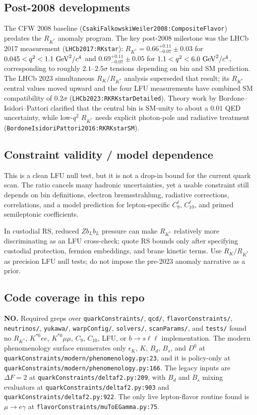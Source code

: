 \subsection*{Post-2008 developments}
The CFW 2008 baseline (\texttt{CsakiFalkowskiWeiler2008:CompositeFlavor})
predates the \(R_{K^*}\) anomaly program.  The key post-2008 milestone was the
LHCb 2017 measurement (\texttt{LHCb2017:RKstar}):
\(R_{K^*}=0.66^{+0.11}_{-0.07}\pm0.03\) for
\(0.045<q^2<1.1~{\rm GeV}^2/c^4\) and
\(0.69^{+0.11}_{-0.07}\pm0.05\) for
\(1.1<q^2<6.0~{\rm GeV}^2/c^4\), corresponding to roughly
\(2.1\)--\(2.5\sigma\) tensions depending on bin and SM prediction.  The
LHCb 2023 simultaneous \(R_K/R_{K^*}\) analysis superseded that result; its
\(R_{K^*}\) central values moved upward and the four LFU measurements have
combined SM compatibility of \(0.2\sigma\)
(\texttt{LHCb2023:RKRKstarDetailed}).  Theory work by
Bordone--Isidori--Pattori clarified that the central bin is SM-unity to about a
\(0.01\) QED uncertainty, while low-\(q^2\) \(R_{K^*}\) needs explicit
photon-pole and radiative treatment
(\texttt{BordoneIsidoriPattori2016:RKRKstarSM}).

\subsection*{Constraint validity / model dependence}
This is a clean LFU null test, but it is not a drop-in bound for the current
quark scan.  The ratio cancels many hadronic uncertainties, yet a usable
constraint still depends on bin definitions, electron bremsstrahlung,
radiative corrections, correlations, and a model prediction for lepton-specific
\(C_9^{\ell}\), \(C_{10}^{\ell}\), and primed semileptonic coefficients.

In custodial RS, reduced \(Z b_L b_L\) pressure can make \(R_{K^*}\)
relatively more discriminating as an LFU cross-check; quote RS bounds only
after specifying custodial protection, fermion embeddings, and brane kinetic
terms.  Use \(R_K/R_{K^*}\) as precision LFU null tests; do not impose the
pre-2023 anomaly narrative as a prior.

\subsection*{Code coverage in this repo}
\textbf{NO.}  Required greps over \texttt{quarkConstraints/}, \texttt{qcd/},
\texttt{flavorConstraints/}, \texttt{neutrinos/}, \texttt{yukawa/},
\texttt{warpConfig/}, \texttt{solvers/}, \texttt{scanParams/}, and
\texttt{tests/} found no \(R_{K^*}\), \(K^{*0}e e\), \(K^{*0}\mu\mu\),
\(C_9\), \(C_{10}\), LFU, or \(b\to s\ell\ell\) implementation.  The modern
phenomenology surface enumerates only \(\epsilon_K\), \(K\), \(B_d\), \(B_s\),
and \(D^0\) at \texttt{quarkConstraints/modern/phenomenology.py:23}, and it
is policy-only at \texttt{quarkConstraints/modern/phenomenology.py:166}.  The
legacy inputs are \(\Delta F=2\) at
\texttt{quarkConstraints/deltaf2.py:209}, with \(B_d\) and \(B_s\) mixing
evaluators at \texttt{quarkConstraints/deltaf2.py:903} and
\texttt{quarkConstraints/deltaf2.py:922}.  The only live lepton-flavor routine
found is \(\mu\to e\gamma\) at \texttt{flavorConstraints/muToEGamma.py:75}.

